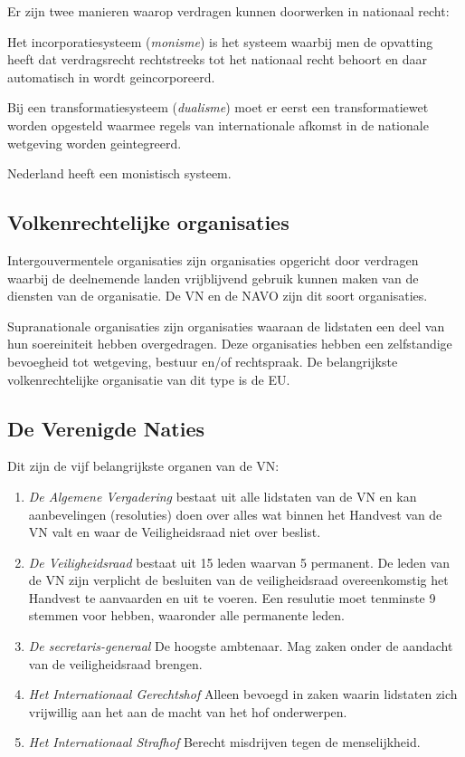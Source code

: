\documentclass{article}
\begin{document}
Er zijn twee manieren waarop verdragen kunnen doorwerken in nationaal recht:

Het incorporatiesysteem (\emph{monisme}) is het systeem waarbij men de opvatting
heeft dat verdragsrecht rechtstreeks tot het nationaal recht behoort en daar
automatisch in wordt geincorporeerd.

Bij een transformatiesysteem (\emph{dualisme}) moet er eerst een transformatiewet
worden opgesteld waarmee regels van internationale afkomst in de nationale wetgeving
worden geintegreerd.

Nederland heeft een monistisch systeem.

\subsection{Volkenrechtelijke organisaties}

Intergouvermentele organisaties zijn organisaties opgericht door verdragen waarbij
de deelnemende landen vrijblijvend gebruik kunnen maken van de diensten van de
organisatie. De VN en de NAVO zijn dit soort organisaties.

Supranationale organisaties zijn organisaties waaraan de lidstaten een deel van
hun soereiniteit hebben overgedragen. Deze organisaties hebben een zelfstandige
bevoegheid tot wetgeving, bestuur en/of rechtspraak. De belangrijkste volkenrechtelijke
organisatie van dit type is de EU.

\subsection{De Verenigde Naties}

Dit zijn de vijf belangrijkste organen van de VN:

\begin{enumerate}

  \item \emph{De Algemene Vergadering} bestaat uit alle lidstaten van de VN en
    kan aanbevelingen (resoluties) doen over alles wat binnen het Handvest van
    de VN valt en waar de Veiligheidsraad niet over beslist.

  \item \emph{De Veiligheidsraad} bestaat uit 15 leden waarvan 5 permanent. De
    leden van de VN zijn verplicht de besluiten van de veiligheidsraad
    overeenkomstig het Handvest te aanvaarden en uit te voeren. Een resulutie
    moet tenminste 9 stemmen voor hebben, waaronder alle permanente leden.

  \item \emph{De secretaris-generaal} De hoogste ambtenaar. Mag zaken onder de
    aandacht van de veiligheidsraad brengen.

  \item \emph{Het Internationaal Gerechtshof} Alleen bevoegd in zaken waarin
    lidstaten zich vrijwillig aan het aan de macht van het hof onderwerpen.

  \item \emph{Het Internationaal Strafhof} Berecht misdrijven tegen de
    menselijkheid.
\end{enumerate}
\end{document}
